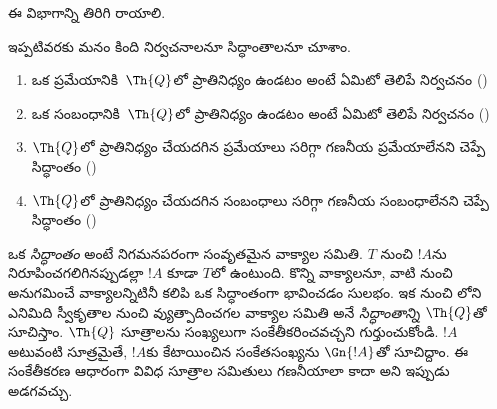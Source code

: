 \documentclass[../../../include/open-logic-section]{subfiles}
\begin{document}


\begin{editorial}
ఈ విభాగాన్ని తిరిగి రాయాలి.
\end{editorial}

ఇప్పటివరకు మనం కింది నిర్వచనాలనూ సిద్ధాంతాలనూ చూశాం.
\begin{enumerate}
\item ఒక ప్రమేయానికి~$\Th{Q}$లో ప్రాతినిధ్యం ఉండటం అంటే ఏమిటో తెలిపే
  నిర్వచనం ()
\item ఒక సంబంధానికి~$\Th{Q}$లో ప్రాతినిధ్యం ఉండటం అంటే ఏమిటో తెలిపే
  నిర్వచనం ()
\item $\Th{Q}$లో ప్రాతినిధ్యం చేయదగిన ప్రమేయాలు సరిగ్గా గణనీయ ప్రమేయాలేనని
  చెప్పే సిద్ధాంతం ()
\item $\Th{Q}$లో ప్రాతినిధ్యం చేయదగిన సంబంధాలు సరిగ్గా గణనీయ సంబంధాలేనని
  చెప్పే సిద్ధాంతం ()
\end{enumerate}

ఒక {\em సిద్ధాంతం} అంటే నిగమనపరంగా సంవృతమైన వాక్యాల సమితి.
$T$ నుంచి $!A$ను నిరూపించగలిగినప్పుడల్లా $!A$ కూడా $T$లో ఉంటుంది.
కొన్ని వాక్యాలనూ, వాటి నుంచి అనుగమించే వాక్యాలన్నిటినీ కలిపి ఒక సిద్ధాంతంగా
భావించడం సులభం. ఇక నుంచి లోని ఎనిమిది స్వీకృతాల నుంచి
వ్యుత్పాదించగల వాక్యాల సమితి అనే {\em సిద్ధాంతాన్ని} $\Th{Q}$తో సూచిస్తాం. $\Th{Q}$ సూత్రాలను సంఖ్యలుగా సంకేతీకరించవచ్చని
గుర్తుంచుకోండి. $!A$ అటువంటి సూత్రమైతే, $!A$కు కేటాయించిన సంకేతసంఖ్యను
$\Gn{!A}$తో సూచిద్దాం. ఈ సంకేతీకరణ ఆధారంగా వివిధ సూత్రాల
సమితులు గణనీయాలా కాదా అని ఇప్పుడు అడగవచ్చు.
\end{document}

